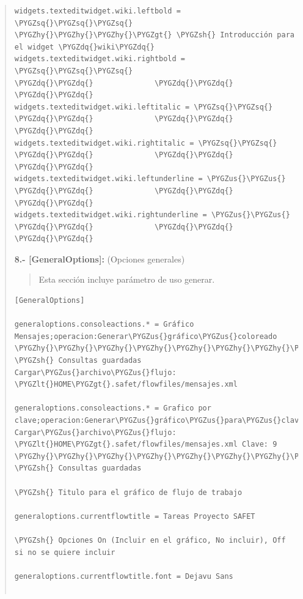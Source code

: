 \documentclass[letterpaper,11pt,spanish]{sphinxmanual}
\def\PYGZus{\char`\_}
\def\PYGZlt{\char`\<}
\def\PYGZgt{\char`\>}
\def\PYGZsh{\char`\#}
\def\PYGZhy{\char`\-}
\def\PYGZsq{\char`\'}
\def\PYGZdq{\char`\"}
\begin{document}
\begin{quote}
\begin{Verbatim}[commandchars=\\\{\}]
widgets.texteditwidget.wiki.leftbold = \PYGZsq{}\PYGZsq{}\PYGZsq{}              \PYGZhy{}\PYGZhy{}\PYGZhy{}\PYGZgt{} \PYGZsh{} Introducción para el widget \PYGZdq{}wiki\PYGZdq{}
widgets.texteditwidget.wiki.rightbold = \PYGZsq{}\PYGZsq{}\PYGZsq{}                     \PYGZdq{}\PYGZdq{}              \PYGZdq{}\PYGZdq{}        \PYGZdq{}\PYGZdq{}
widgets.texteditwidget.wiki.leftitalic = \PYGZsq{}\PYGZsq{}                     \PYGZdq{}\PYGZdq{}              \PYGZdq{}\PYGZdq{}        \PYGZdq{}\PYGZdq{}
widgets.texteditwidget.wiki.rightitalic = \PYGZsq{}\PYGZsq{}                    \PYGZdq{}\PYGZdq{}              \PYGZdq{}\PYGZdq{}        \PYGZdq{}\PYGZdq{}
widgets.texteditwidget.wiki.leftunderline = \PYGZus{}\PYGZus{}                  \PYGZdq{}\PYGZdq{}              \PYGZdq{}\PYGZdq{}        \PYGZdq{}\PYGZdq{}
widgets.texteditwidget.wiki.rightunderline = \PYGZus{}\PYGZus{}                 \PYGZdq{}\PYGZdq{}              \PYGZdq{}\PYGZdq{}        \PYGZdq{}\PYGZdq{}
\end{Verbatim}

\textbf{8.- {[}GeneralOptions{]}:} (Opciones generales)
\begin{quote}

Esta sección incluye  parámetro de uso generar.
\end{quote}

\begin{Verbatim}[commandchars=\\\{\}]
[GeneralOptions]

generaloptions.consoleactions.* = Gráfico Mensajes;operacion:Generar\PYGZus{}gráfico\PYGZus{}coloreado   \PYGZhy{}\PYGZhy{}\PYGZhy{}\PYGZhy{}\PYGZhy{}\PYGZhy{}\PYGZhy{}\PYGZhy{}\PYGZhy{}\PYGZgt{} \PYGZsh{} Consultas guardadas
Cargar\PYGZus{}archivo\PYGZus{}flujo: \PYGZlt{}HOME\PYGZgt{}.safet/flowfiles/mensajes.xml

generaloptions.consoleactions.* = Grafico por clave;operacion:Generar\PYGZus{}gráfico\PYGZus{}para\PYGZus{}clave
Cargar\PYGZus{}archivo\PYGZus{}flujo: \PYGZlt{}HOME\PYGZgt{}.safet/flowfiles/mensajes.xml Clave: 9      \PYGZhy{}\PYGZhy{}\PYGZhy{}\PYGZhy{}\PYGZhy{}\PYGZhy{}\PYGZhy{}\PYGZhy{}\PYGZhy{}\PYGZgt{} \PYGZsh{} Consultas guardadas

\PYGZsh{} Titulo para el gráfico de flujo de trabajo

generaloptions.currentflowtitle = Tareas Proyecto SAFET

\PYGZsh{} Opciones On (Incluir en el gráfico, No incluir), Off si no se quiere incluir

generaloptions.currentflowtitle.font = Dejavu Sans


\end{Verbatim}
\end{quote}
\end{document}
